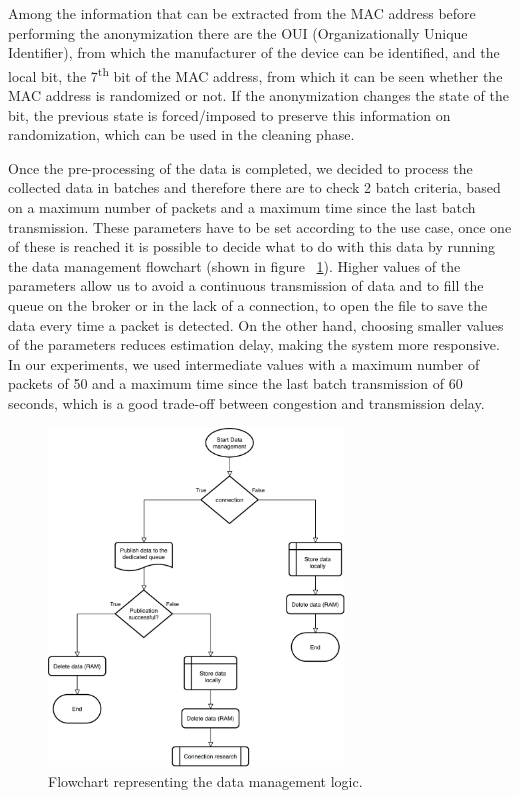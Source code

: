 Among the information that can be extracted from the MAC address before performing the anonymization there are the OUI (Organizationally Unique Identifier), from which the manufacturer of the device can be identified, and the local bit, the 7\textsuperscript{th} bit of the MAC address, from which it can be seen whether the MAC address is randomized or not. If the anonymization changes the state of the bit, the previous state is forced/imposed to preserve this information on randomization, which can be used in the cleaning phase.

Once the pre-processing of the data is completed, we decided to process the collected data in batches and therefore there are to check 2 batch criteria, based on a maximum number of packets and a maximum time since the last batch transmission. These parameters have to be set according to the use case, once one of these is reached it is possible to decide what to do with this data by running the data management flowchart (shown in figure ~\ref{fig:flowdata}).
Higher values of the parameters allow us to avoid a continuous transmission of data and to fill the queue on the broker or in the lack of a connection, to open the file to save the data every time a packet is detected. On the other hand, choosing smaller values of the parameters reduces estimation delay, making the system more responsive. In our experiments, we used intermediate values with a maximum number of packets of 50 and a maximum time since the last batch transmission of 60 seconds, which is a good trade-off between congestion and transmission delay.

\begin{figure}[h]
\centering 
\includegraphics[width=0.7\textwidth]{images/flowdata} 
\caption{Flowchart representing the data management logic.}
\label{fig:flowdata}
\end{figure}

